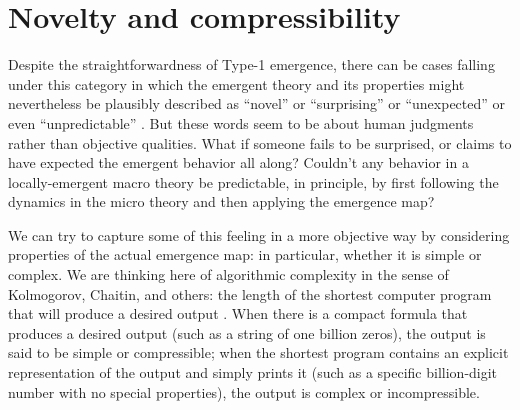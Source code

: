 \documentclass[12pt,english]{article}
\newcommand{\autocite}{\cite}
\begin{document}
\section*{Novelty and compressibility}

Despite the straightforwardness of Type-1 emergence, there can be cases falling under this category in which the emergent theory and its properties might nevertheless be plausibly described as ``novel” or ``surprising” or ``unexpected” or even ``unpredictable'' \autocite{anderson1972more}.
But these words seem to be about human judgments rather than objective qualities.
What if someone fails to be surprised, or claims to have expected the emergent behavior all along?
Couldn't any behavior in a locally-emergent macro theory be predictable, in principle, by first following the dynamics in the micro theory and then applying the emergence map?

We can try to capture some of this feeling in a more objective way by considering properties of the actual emergence map: in particular, whether it is simple or complex. 
We are thinking here of algorithmic complexity in the sense of Kolmogorov, Chaitin, and others: the length of the shortest computer program that will produce a desired output \autocite{li2008introduction}.
When there is a compact formula that produces a desired output (such as a string of one billion zeros), the output is said to be simple or compressible; when the shortest program contains an explicit representation of the output and simply prints it (such as a specific billion-digit number with no special properties), the output is complex or incompressible.
\end{document}
